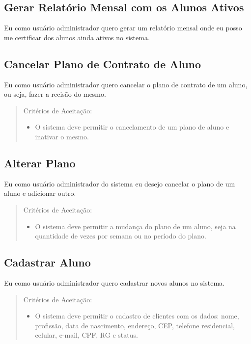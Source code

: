 \subsection[Gerar Relatório Mensal com os Alunos Ativos]{Gerar Relatório Mensal com os Alunos Ativos}
Eu como usuário administrador quero gerar um relatório mensal onde eu posso me
certificar dos alunos ainda ativos no sistema.

\subsection[Cancelar Plano de Contrato de Aluno]{Cancelar Plano de Contrato de Aluno}
Eu como usuário administrador quero cancelar o plano de contrato de um aluno,
 ou seja, fazer a recisão do mesmo.

\begin{quote}
Critérios de Aceitação:
    \begin{itemize}
        \item O sistema deve permitir o cancelamento de um plano de aluno e inativar o mesmo.
    \end{itemize}
\end{quote} 

\subsection[Alterar Plano]{Alterar Plano}
Eu como usuário administrador do sistema eu desejo cancelar o plano de um aluno e adicionar outro.

\begin{quote}
Critérios de Aceitação:
    \begin{itemize}
        \item O sistema deve permitir a mudança do plano de um aluno, seja na quantidade de vezes por semana ou no período do plano.
    \end{itemize}
\end{quote} 

\subsection[Cadastrar Aluno]{Cadastrar Aluno}
Eu como usuário administrador quero cadastrar novos alunos no sistema.

\begin{quote}
Critérios de Aceitação:
    \begin{itemize}
        \item O sistema deve permitir o cadastro de clientes com os dados: nome, profissão,
        data de nascimento, endereço, CEP, telefone residencial, celular, e-mail, CPF,
        RG e status.
    \end{itemize}
\end{quote}

